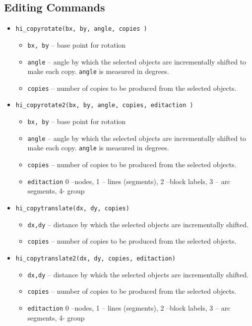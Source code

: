 \subsection{Editing Commands}
\begin{itemize}

\item{\tt hi\_copyrotate(bx, by, angle, copies )}
        \begin{itemize}
        \item{\tt bx, by} -- base point for rotation
        \item{\tt angle} -- angle by which the selected objects are incrementally
        shifted to make each copy.  {\tt angle} is measured in degrees.
        \item{\tt copies} -- number of copies to be produced from
        the selected objects.
        \end{itemize}

\item{\tt hi\_copyrotate2(bx, by, angle, copies, editaction )}
        \begin{itemize}
        \item{\tt bx, by} -- base point for rotation
        \item{\tt angle} -- angle by which the selected objects are incrementally
        shifted to make each copy.  {\tt angle} is measured in degrees.
        \item{\tt copies} -- number of copies to be produced from
        the selected objects.
        \item{\tt editaction}  0 --nodes, 1 -- lines (segments), 2 --block labels, 3 -- arc
                segments, 4- group
        \end{itemize}

\item{\tt hi\_copytranslate(dx, dy, copies)}
        \begin{itemize}
        \item{\tt dx,dy} -- distance by which the selected objects are incrementally shifted.
        \item{\tt copies} -- number of copies to be produced from the selected objects.
        \end{itemize}

\item{\tt hi\_copytranslate2(dx, dy, copies, editaction)}
        \begin{itemize}
        \item{\tt dx,dy} -- distance by which the selected objects are incrementally shifted.
        \item{\tt copies} -- number of copies to be produced from the selected objects.
        \item{\tt editaction}  0 --nodes, 1 -- lines (segments), 2 --block labels, 3 -- arc
                segments, 4- group
        \end{itemize}


\end{itemize}
